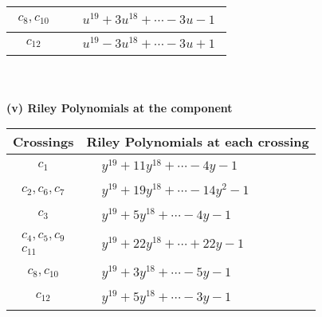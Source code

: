 \documentclass[1p]{elsarticle_modified}
\theoremstyle{definition}
\begin{document}
\begin{tabular}{m{50pt}|m{274pt}}
\hline $$\begin{aligned}c_{8},c_{10}\end{aligned}$$&$\begin{aligned}
&u^{19}+3 u^{18}+\cdots-3 u-1
\end{aligned}$\\
\hline $$\begin{aligned}c_{12}\end{aligned}$$&$\begin{aligned}
&u^{19}-3 u^{18}+\cdots-3 u+1
\end{aligned}$\\
\hline
\end{tabular}\\~\\
\newpage\renewcommand{\arraystretch}{1}
\flushleft \textbf{(v) Riley Polynomials at the component}\newline \\
\begin{tabular}{m{50pt}|m{274pt}}
Crossings & \hspace{64pt}Riley Polynomials at each crossing \\
\hline $$\begin{aligned}c_{1}\end{aligned}$$&$\begin{aligned}
&y^{19}+11 y^{18}+\cdots-4 y-1
\end{aligned}$\\
\hline $$\begin{aligned}c_{2},c_{6},c_{7}\end{aligned}$$&$\begin{aligned}
&y^{19}+19 y^{18}+\cdots-14 y^2-1
\end{aligned}$\\
\hline $$\begin{aligned}c_{3}\end{aligned}$$&$\begin{aligned}
&y^{19}+5 y^{18}+\cdots-4 y-1
\end{aligned}$\\
\hline $$\begin{aligned}c_{4},c_{5},c_{9}\\c_{11}\end{aligned}$$&$\begin{aligned}
&y^{19}+22 y^{18}+\cdots+22 y-1
\end{aligned}$\\
\hline $$\begin{aligned}c_{8},c_{10}\end{aligned}$$&$\begin{aligned}
&y^{19}+3 y^{18}+\cdots-5 y-1
\end{aligned}$\\
\hline $$\begin{aligned}c_{12}\end{aligned}$$&$\begin{aligned}
&y^{19}+5 y^{18}+\cdots-3 y-1
\end{aligned}$\\
\hline
\end{tabular}\\~\\
\end{document}
